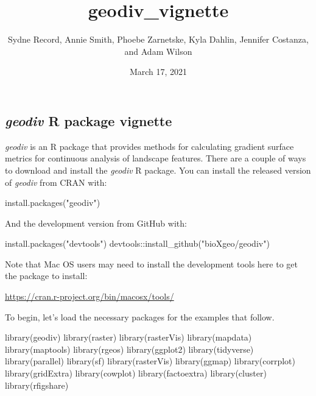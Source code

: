 \documentclass[
]{article}
\title{geodiv\_vignette}
\author{Sydne Record, Annie Smith, Phoebe Zarnetske, Kyla Dahlin,
Jennifer Costanza, and Adam Wilson}
\date{March 17, 2021}
\newenvironment{Shaded}{\begin{snugshade}}{\end{snugshade}}
\newcommand{\FunctionTok}[1]{\textcolor[rgb]{0.00,0.00,0.00}{#1}}
\newcommand{\NormalTok}[1]{#1}
\newcommand{\SpecialCharTok}[1]{\textcolor[rgb]{0.00,0.00,0.00}{#1}}
\newcommand{\StringTok}[1]{\textcolor[rgb]{0.31,0.60,0.02}{#1}}
\begin{document}
\maketitle

\hypertarget{geodiv-r-package-vignette}{%
\subsection{\texorpdfstring{\emph{geodiv} R package
vignette}{geodiv R package vignette}}\label{geodiv-r-package-vignette}}

\emph{geodiv} is an R package that provides methods for calculating
gradient surface metrics for continuous analysis of landscape features.
There are a couple of ways to download and install the \emph{geodiv} R
package. You can install the released version of \emph{geodiv} from CRAN
with:

\begin{Shaded}
\begin{Highlighting}[]
\FunctionTok{install.packages}\NormalTok{(}\StringTok{"geodiv"}\NormalTok{)}
\end{Highlighting}
\end{Shaded}

And the development version from GitHub with:

\begin{Shaded}
\begin{Highlighting}[]
\FunctionTok{install.packages}\NormalTok{(}\StringTok{"devtools"}\NormalTok{)}
\NormalTok{devtools}\SpecialCharTok{::}\FunctionTok{install\_github}\NormalTok{(}\StringTok{"bioXgeo/geodiv"}\NormalTok{)}
\end{Highlighting}
\end{Shaded}

Note that Mac OS users may need to install the development tools here to
get the package to install:

\url{https://cran.r-project.org/bin/macosx/tools/}

To begin, let's load the necessary packages for the examples that
follow.

\begin{Shaded}
\begin{Highlighting}[]
\FunctionTok{library}\NormalTok{(geodiv)}
\FunctionTok{library}\NormalTok{(raster)}
\FunctionTok{library}\NormalTok{(rasterVis)}
\FunctionTok{library}\NormalTok{(mapdata)}
\FunctionTok{library}\NormalTok{(maptools)}
\FunctionTok{library}\NormalTok{(rgeos)}
\FunctionTok{library}\NormalTok{(ggplot2)}
\FunctionTok{library}\NormalTok{(tidyverse)}
\FunctionTok{library}\NormalTok{(parallel)}
\FunctionTok{library}\NormalTok{(sf)}
\FunctionTok{library}\NormalTok{(rasterVis)}
\FunctionTok{library}\NormalTok{(ggmap)}
\FunctionTok{library}\NormalTok{(corrplot)}
\FunctionTok{library}\NormalTok{(gridExtra)}
\FunctionTok{library}\NormalTok{(cowplot)}
\FunctionTok{library}\NormalTok{(factoextra)}
\FunctionTok{library}\NormalTok{(cluster)}
\FunctionTok{library}\NormalTok{(rfigshare)}
\end{Highlighting}
\end{Shaded}
\end{document}

